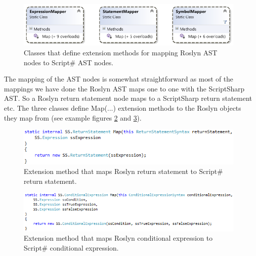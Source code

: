 		\begin{figure}[H]
			\begin{center}
				\centerline{\includegraphics[width=14cm]{resources/images/MapperClasses.png}}
			\end{center}
			\caption{Classes that define extension methods for mapping Roslyn AST nodes to Script\# AST nodes.}
			\label{mapperClasses}
		\end{figure}

		The mapping of the AST nodes is somewhat straightforward as most of the mappings we have done the Roslyn AST maps one to one with the ScriptSharp AST. So a Roslyn return statement node maps to a ScriptSharp return statement etc. The three classes define Map(...) extension methods to the Roslyn objects they map from (see example figures \ref{returnStatementMap} and \ref{conditionaleExpressionMap}).

		\begin{figure}[H]
			\begin{center}
				\centerline{\includegraphics[width=14cm]{resources/images/ReturnStatementMap.png}}
			\end{center}
			\caption{Extension method that maps Roslyn return statement to Script\# return statement.}
			\label{returnStatementMap}
		\end{figure}

		\begin{figure}[H]
			\begin{center}
				\centerline{\includegraphics[width=14cm]{resources/images/ConditionalExpressionMap.png}}
			\end{center}
			\caption{Extension method that maps Roslyn conditional expression to Script\# conditional expression.}
			\label{conditionaleExpressionMap}
		\end{figure}

